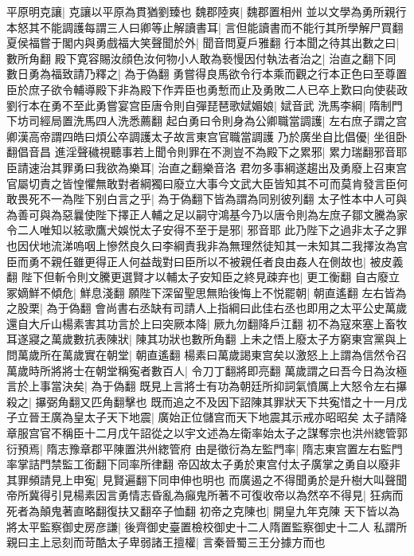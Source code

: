 平原明克讓|{
	克讓以平原為貫猶劉臻也}
魏郡陸爽|{
	魏郡置相州}
並以文學為勇所親行本怒其不能調護每謂三人曰卿等止解讀書耳|{
	言但能讀書而不能行其所學解尸買翻}
夏侯福嘗于閣内與勇戲福大笑聲聞於外|{
	聞音問夏戶雅翻}
行本聞之待其出數之曰|{
	數所角翻}
殿下寛容賜汝顔色汝何物小人敢為䙝慢因付執法者治之|{
	治直之翻下同}
數日勇為福致請乃釋之|{
	為于偽翻}
勇嘗得良馬欲令行本乘而觀之行本正色曰至尊置臣於庶子欲令輔導殿下非為殿下作弄臣也勇慙而止及勇敗二人已卒上歎曰向使裴政劉行本在勇不至此勇嘗宴宫臣唐令則自彈琵琶歌娬媚娘|{
	娬音武}
洗馬李綱|{
	隋制門下坊司經局置洗馬四人洗悉薦翻}
起白勇曰令則身為公卿職當調護|{
	左右庶子謂之宫卿漢高帝謂四皓曰煩公卒調護太子故言東宫官職當調護}
乃於廣坐自比倡優|{
	坐徂卧翻倡音昌}
進淫聲穢視聽事若上聞令則罪在不測豈不為殿下之累邪|{
	累力瑞翻邪音耶}
臣請速治其罪勇曰我欲為樂耳|{
	治直之翻樂音洛}
君勿多事綱遂趨出及勇廢上召東宫官屬切責之皆惶懼無敢對者綱獨曰廢立大事今文武大臣皆知其不可而莫肯發言臣何敢畏死不一為陛下别白言之乎|{
	為于偽翻下皆為謂為同别彼列翻}
太子性本中人可與為善可與為惡曩使陛下擇正人輔之足以嗣守鴻基今乃以唐令則為左庶子鄒文騰為家令二人唯知以絃歌鷹犬娛悦太子安得不至于是邪|{
	邪音耶}
此乃陛下之過非太子之罪也因伏地流涕嗚咽上慘然良久曰李綱責我非為無理然徒知其一未知其二我擇汝為宫臣而勇不親任雖更得正人何益哉對曰臣所以不被親任者良由姦人在側故也|{
	被皮義翻}
陛下但斬令則文騰更選賢才以輔太子安知臣之終見疎弃也|{
	更工衡翻}
自古廢立冢嫡鮮不傾危|{
	鮮息淺翻}
願陛下深留聖思無貽後悔上不悦罷朝|{
	朝直遙翻}
左右皆為之股栗|{
	為于偽翻}
會尚書右丞缺有司請人上指綱曰此佳右丞也即用之太平公史萬歲還自大斤山楊素害其功言於上曰突厥本降|{
	厥九勿翻降戶江翻}
初不為寇來塞上畜牧耳遂寢之萬歲數抗表陳狀|{
	陳其功狀也數所角翻}
上未之悟上廢太子方窮東宫黨與上問萬歲所在萬歲實在朝堂|{
	朝直遙翻}
楊素曰萬歲謁東宫矣以激怒上上謂為信然令召萬歲時所將將士在朝堂稱寃者數百人|{
	令刀丁翻將即亮翻}
萬歲謂之曰吾今日為汝極言於上事當決矣|{
	為于偽翻}
既見上言將士有功為朝廷所抑詞氣憤厲上大怒令左右㩧殺之|{
	㩧弼角翻又匹角翻擊也}
既而追之不及因下詔陳其罪狀天下共寃惜之十一月戊子立晉王廣為皇太子天下地震|{
	廣始正位儲宫而天下地震其示戒亦昭昭矣}
太子請降章服宫官不稱臣十二月戊午詔從之以宇文述為左衛率始太子之謀奪宗也洪州緫管郭衍預焉|{
	隋志豫章郡平陳置洪州緫管府}
由是徵衍為左監門率|{
	隋志東宫置左右監門率掌詰門禁監工銜翻下同率所律翻}
帝囚故太子勇於東宫付太子廣掌之勇自以廢非其罪頻請見上申寃|{
	見賢遍翻下同申伸也明也}
而廣遏之不得聞勇於是升樹大叫聲聞帝所冀得引見楊素因言勇情志昏亂為癲鬼所著不可復收帝以為然卒不得見|{
	狂病而死者為顛鬼著直略翻復扶又翻卒子恤翻}
初帝之克陳也|{
	開皇九年克陳}
天下皆以為將太平監察御史房彦謙|{
	後齊御史臺置檢校御史十二人隋置監察御史十二人}
私謂所親曰主上忌刻而苛酷太子卑弱諸王擅權|{
	言秦晉蜀三王分據方而也}
